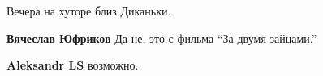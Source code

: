  
 
 
 
 
Вечера на хуторе близ Диканьки.

\textbf{Вячеслав Юфриков} Да не, это с фильма \enquote{За двумя зайцами.}

\textbf{Aleksandr LS} возможно.
